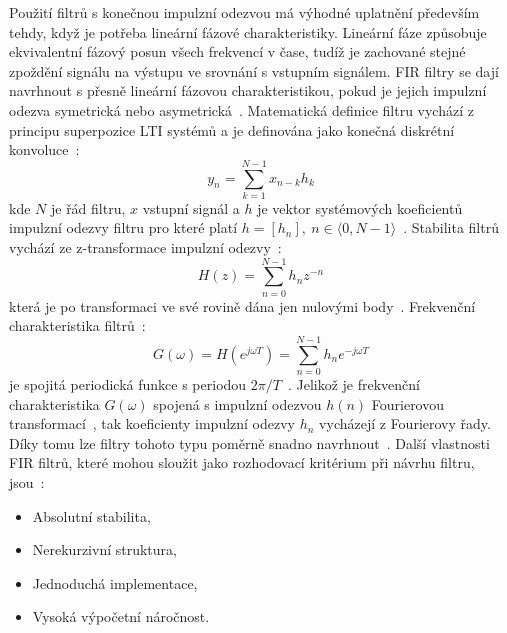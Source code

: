 Použití filtrů s konečnou impulzní odezvou má výhodné uplatnění především tehdy,
když je potřeba lineární fázové charakteristiky. Lineární fáze způsobuje
ekvivalentní fázový posun všech frekvencí v čase, tudíž je zachované stejné
zpoždění signálu na výstupu ve srovnání s vstupním signálem. FIR filtry se dají
navrhnout s přesně lineární fázovou charakteristikou, pokud je jejich impulzní
odezva symetrická nebo asymetrická~\cite{Prchal2000}. Matematická definice
filtru vychází z principu superpozice LTI systémů a je definována jako konečná
diskrétní konvoluce~\cite{Jan2002}:
\begin{equation}
	\label{eq:conv_fir}
	y_n = \sum_{k=1}^{N-1} x_{n-k} h_k
\end{equation}
kde $N$ je řád filtru, $x$ vstupní signál a $h$ je vektor systémových koeficientů
impulzní odezvy filtru pro které platí $h = [h_n],~n \in \langle 0,N-1
\rangle$~\cite{Jan2002}. Stabilita filtrů vychází ze z-transformace impulzní
odezvy~\cite{Jan2002}:
\begin{equation}
	\label{eq:transfer_fir}
	H(z) = \sum_{n=0}^{N-1} h_n z^{-n}
\end{equation}
která je po transformaci ve své rovině dána jen nulovými body~\cite{Jan2002}.
Frekvenční charakteristika filtrů~\cite{Jan2002}:
\begin{equation}
	\label{eq:freq_fir}
	G(\omega) = H(e^{j \omega T}) = \sum_{n=0}^{N-1} h_n e^{-j \omega T}
\end{equation}
je spojitá periodická funkce s periodou $2\pi/T$~\cite{Jan2002}. Jelikož je
frekvenční charakteristika $G(\omega)$ spojená s impulzní odezvou
$h(n)$ Fourierovou transformací~\cite{Prchal2000}, tak koeficienty impulzní
odezvy $h_n$ vycházejí z Fourierovy řady. Díky tomu lze filtry tohoto typu
poměrně snadno navrhnout~\cite{Jan2002}. Další vlastnosti FIR filtrů, které
mohou sloužit jako rozhodovací kritérium při návrhu filtru,
jsou~\cite{Prchal2000}:
\begin{itemize}[noitemsep]
	\item Absolutní stabilita,
	\item Nerekurzivní struktura,
	\item Jednoduchá implementace,
	\item Vysoká výpočetní náročnost.
\end{itemize}

